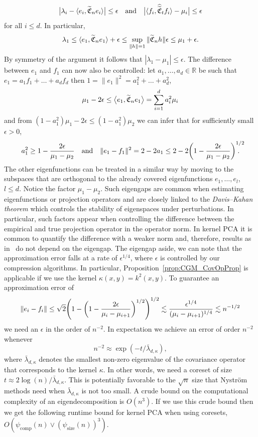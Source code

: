 \documentclass[AHL,Unicode,longabstracts,published]{cedram}
\theoremstyle{remark}
\newcommand{\compp}{\mathrm{comp}}
\newcommand{\ssize}{\mathrm{size}}
\newcommand{\R}{\mathbb{R}}
\newcommand{\fkC}{\mathfrak{C}}
\newcommand{\wh}{\widehat}
\let\oldtilde\tilde
\renewcommand*{\tilde}[1]{\mathchoice{\widetilde{#1}}{\widetilde{#1}}{\oldtilde{#1}}{\oldtilde{#1}}}
\let\originalleft\left
\let\originalright\right
\renewcommand{\left}{\mathopen{}\mathclose\bgroup\originalleft}
\renewcommand{\right}{\aftergroup\egroup\originalright}
\begin{document}
\[
\bigl|\lambda_i - \langle e_i, \tilde{\fkC}_n e_i \rangle\bigr| \leq \epsilon \quad\text{and}\quad \bigl|\langle f_i, \wh{\oldtilde{\fkC}}_t f_i \rangle - \mu_i\bigr| \leq \epsilon
\]
for all $i\leq d$. In particular,
\[
\lambda_1 \leq \langle e_1, \tilde{\fkC}_n e_1 \rangle + \epsilon \leq
\sup_{\|h\|=1} \|\tilde{\fkC}_n h\| \epsilon \leq \mu_1 +\epsilon.
\]
By symmetry of the argument it follows that $|\lambda_1 - \mu_1| \leq \epsilon$. The difference between $e_1$ and $f_1$ can now also be controlled: let $a_1,\dots, a_d \in \R$ be such that $ e_1 = a_1 f_1 + \dots + a_d f_d$ then $1 = \|e_1\|^2 = a_1^2 + \dots +a_d^2$,
\[
\mu_1 - 2\epsilon \leq \bigl\langle e_1, \tilde{\fkC}_n e_1 \bigr\rangle =
\sum_{i=1}^d a_i^2 \mu_i
\]
and from $(1-a_1^2) \mu_1 -2 \epsilon \leq (1-a_1^2) \mu_2$ we can infer that for sufficiently small $\epsilon >0$,
\[
a_1^2 \geq 1 - \frac{2 \epsilon}{\mu_1 - \mu_2} \quad\text{and}\quad
\|e_1 - f_1\|^2 = 2 - 2 a_1 \leq 2 -2 \left(1- \frac{2\epsilon}{\mu_1 - \mu_2}\right)^{1/2}\!\!\!\!\!\!.
\]
The other eigenfunctions can be treated in a similar way by moving to the subspaces that are orthogonal to the already covered eigenfunctions $e_1,\dots, e_l$, $l\leq d$. Notice the factor $\mu_1 - \mu_2$. Such eigengaps are common when estimating eigenfunctions or projection operators and are closely linked to the \emph{Davis--Kahan theorem} which controls the stability of eigenspaces under perturbations. In particular, such factors appear when controlling the difference between the empirical and true projection operator in the operator norm. In kernel PCA it is common to quantify the difference with a weaker norm and, therefore, results as in~\cite{STER20} do not depend on the eigengap. The eigengap aside, we can note that the approximation error falls at a rate of $\epsilon^{1/4}$, where $\epsilon$ is controlled by our compression algorithms. In particular, Proposition~\ref{prop:CGM_CovOpProp} is applicable if we use the kernel $\kappa(x,y) =k^2(x,y)$. To guarantee an approximation error of
\[
\|e_i - f_i\| \leq \sqrt{2}\left(1 - \left(1- \frac{2 \epsilon}{\mu_i - \mu_{i+1} } \right)^{1/2} \right)^{1/2} \lesssim \frac{\epsilon^{1/4}}{(\mu_i - \mu_{i+1})^{1/4}} \lesssim n^{-1/2}
\]
we need an $\epsilon$ in the order of $n^{-2}$. In expectation we achieve an error of order $n^{-2}$ whenever
\[
n^{-2} \approx \exp(-t/ \bar \lambda_{d,\kappa}),
\]
where $\bar \lambda_{d,\kappa}$ denotes the smallest non-zero eigenvalue of the covariance operator that corresponds to the kernel $\kappa$. In other words, we need a coreset of size $t \approx 2\log(n)/\bar \lambda_{d,\kappa}$. This is potentially favorable to the $\sqrt{n}$ size that Nystr\"om methods need when $\bar \lambda_{d,\kappa}$ is not too small. A crude bound on the computational complexity of an eigendecomposition is $O(n^3)$. If we use this crude bound then we get the following runtime bound for kernel PCA when using coresets, $O(\psi_{\compp}(n) \vee (\psi_{\ssize}(n))^3)$.
\end{document}
